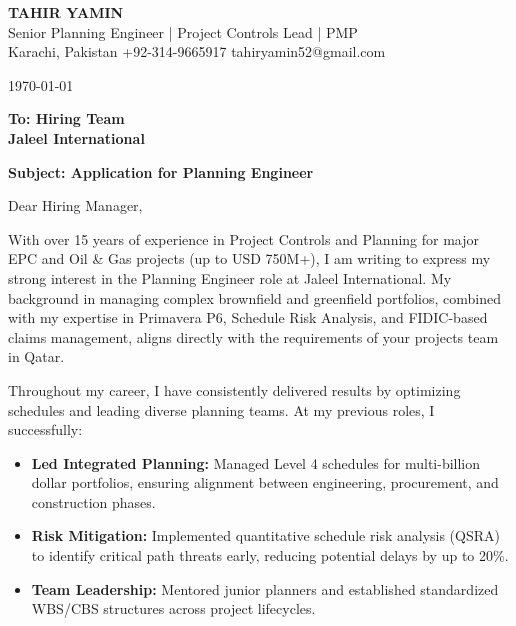\documentclass[11pt,a4paper]{article}
\begin{document}
\begin{center}
    {\Huge \textbf{\color{awesome-darknight} TAHIR YAMIN}} \\[0.2cm]
    {\Large \color{awesome-gray} Senior Planning Engineer | Project Controls Lead | PMP} \\[0.3cm]
    
    \small \color{light-gray}
    Karachi, Pakistan \quad \textbullet \quad 
    +92-314-9665917 \quad \textbullet \quad 
    tahiryamin52@gmail.com
\end{center}

\vspace{0.8cm}
\today
\vspace{0.5cm}

\textbf{To: Hiring Team} \\
\textbf{Jaleel International} \\
\vspace{0.5cm}

\textbf{Subject: Application for Planning Engineer}

\vspace{0.5cm}

Dear Hiring Manager,

With over 15 years of experience in Project Controls and Planning for major EPC and Oil \& Gas projects (up to USD 750M+), I am writing to express my strong interest in the Planning Engineer role at Jaleel International. My background in managing complex brownfield and greenfield portfolios, combined with my expertise in Primavera P6, Schedule Risk Analysis, and FIDIC-based claims management, aligns directly with the requirements of your projects team in Qatar.

Throughout my career, I have consistently delivered results by optimizing schedules and leading diverse planning teams. At my previous roles, I successfully:

\begin{itemize}
    \item \textbf{Led Integrated Planning:} Managed Level 4 schedules for multi-billion dollar portfolios, ensuring alignment between engineering, procurement, and construction phases.
    \item \textbf{Risk Mitigation:} Implemented quantitative schedule risk analysis (QSRA) to identify critical path threats early, reducing potential delays by up to 20\%.
    \item \textbf{Team Leadership:} Mentored junior planners and established standardized WBS/CBS structures across project lifecycles.
\end{itemize}
\end{document}

